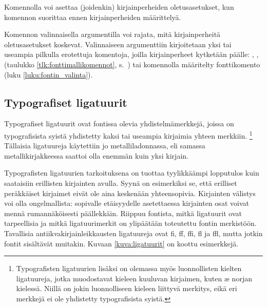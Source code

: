 Komennolla%
  voi asettaa (joidenkin) kirjainperheiden
oletusasetukset, kun komennon suorittaa ennen kirjainperheiden
määrittelyä.

\begin{koodilohkosis}
\end{koodilohkosis}

Komennon valinnaisella argumentilla voi rajata, mitä kirjainperheitä
oletusasetukset koskevat. Valinnaiseen argumenttiin kirjoitetaan yksi
tai useampia pilkulla erotettuja komentoja, joilla kirjainperheet
kytketään päälle: , ,
 (taulukko \ref{tlk:fonttimallikomennot},
s.~\pageref{tlk:fonttimallikomennot}) tai komennolla  määritelty fonttikomento (luku
\ref{luku:fontin_valinta}).

\subsection{Typografiset ligatuurit}
\label{luku:typo_liga}

Typografiset ligatuurit ovat fontissa olevia yhdistelmämerkkejä, joissa
on typografisista syistä yhdistetty kaksi tai useampia kirjaimia yhteen
merkkiin.%
\footnote{Typografisten ligatuurien lisäksi on olemassa myös
  luonnollisten kielten ligatuureja, jotka muodostavat kieleen kuuluvan
  kirjaimen, kuten æ norjan kielessä. Niillä on jokin luonnolliseen
  kieleen liittyvä merkitys, eikä eri merkkejä ei ole yhdistetty
  typografisista syistä.} Tällaisia ligatuureja käytettiin jo
metalliladonnassa, eli samassa metallikirjakkeessa saattoi olla enemmän
kuin yksi kirjain.

Typografisten ligatuurien tarkoituksena on tuottaa tyylikkäämpi
lopputulos kuin saataisiin erillisten kirjainten avulla. Syynä on
esimerkiksi se, että erilliset peräkkäiset kirjaimet eivät ole aina
keskenään yhteensopivia. Kirjainten välistys voi olla ongelmallista:
sopivalle etäisyydelle asetettaessa kirjainten osat voivat mennä
rumannäköisesti päällekkäin. Riippuu fontista, mitkä ligatuurit ovat
tarpeellisia ja mitkä ligatuurimerkit on ylipäätään toteutettu fontin
merkistöön. Tavallisia an\-tiik\-va\-kir\-jain\-leik\-kaus\-ten
ligatuureja ovat fi, ff, ffi, fl ja ffl, mutta jotkin fontit sisältävät
muitakin. Kuvaan \ref{kuva:ligatuurit} on koottu esimerkkejä.


